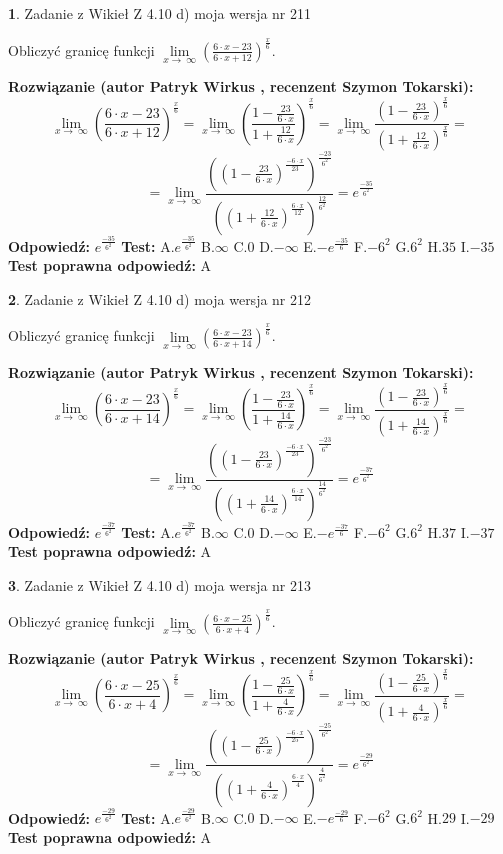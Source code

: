 \documentclass[12pt, a4paper]{article}
\theoremstyle{definition} %
\newtheorem{zad}{}
\newcommand{\zadStart}[1]{\begin{zad}#1\newline}
\newcommand{\zadStop}{\end{zad}}
\newcommand{\rozwStart}[2]{\noindent \textbf{Rozwiązanie (autor #1 , recenzent #2): }\newline}
\newcommand{\rozwStop}{\newline}
\newcommand{\odpStart}{\noindent \textbf{Odpowiedź:}\newline}
\newcommand{\odpStop}{\newline}
\newcommand{\testStart}{\noindent \textbf{Test:}\newline}
\newcommand{\testStop}{\newline}
\newcommand{\kluczStart}{\noindent \textbf{Test poprawna odpowiedź:}\newline}
\newcommand{\kluczStop}{\newline}
\begin{document}
\zadStart{Zadanie z Wikieł Z 4.10 d) moja wersja nr 211}


Obliczyć granicę funkcji  $\lim\limits_{x\to\ \infty}(\frac{6\cdot x-23}{6\cdot x+12})^{\frac{x}{6}}$.
\zadStop
\rozwStart{Patryk Wirkus}{Szymon Tokarski}
$$\lim\limits_{x\to\ \infty}(\frac{6\cdot x-23}{6\cdot x+12})^{\frac{x}{6}} = \lim\limits_{x\to\ \infty}(\frac{1-\frac{23}{6\cdot x}}{1+\frac{12}{6\cdot x}})^{\frac{x}{6}}=\lim\limits_{x\to\ \infty}\frac{(1-\frac{23}{6\cdot x})^{\frac{x}{6}}}{(1+\frac{12}{6\cdot x})^{\frac{x}{6}}}=$$
$$=\lim\limits_{x\to\ \infty}\frac{((1-\frac{23}{6\cdot x})^{\frac{-6\cdot x}{23}})^{\frac{-23}{6^{2}}}}{((1+\frac{12}{6\cdot x})^{\frac{6\cdot x}{12}})^{\frac{12}{6^{2}}}}=e^{\frac{-35}{6^{2}}}$$
\rozwStop
\odpStart
$e^{\frac{-35}{6^{2}}}$
\odpStop
\testStart
A.$e^{\frac{-35}{6^{2}}}$ B.$\infty$ C.$0$ D.$-\infty$ E.$-e^{\frac{-35}{6}}$
F.$-6^{2}$ G.$6^{2}$
H.$35$
I.$-35$
\testStop
\kluczStart
A
\kluczStop



\zadStart{Zadanie z Wikieł Z 4.10 d) moja wersja nr 212}


Obliczyć granicę funkcji  $\lim\limits_{x\to\ \infty}(\frac{6\cdot x-23}{6\cdot x+14})^{\frac{x}{6}}$.
\zadStop
\rozwStart{Patryk Wirkus}{Szymon Tokarski}
$$\lim\limits_{x\to\ \infty}(\frac{6\cdot x-23}{6\cdot x+14})^{\frac{x}{6}} = \lim\limits_{x\to\ \infty}(\frac{1-\frac{23}{6\cdot x}}{1+\frac{14}{6\cdot x}})^{\frac{x}{6}}=\lim\limits_{x\to\ \infty}\frac{(1-\frac{23}{6\cdot x})^{\frac{x}{6}}}{(1+\frac{14}{6\cdot x})^{\frac{x}{6}}}=$$
$$=\lim\limits_{x\to\ \infty}\frac{((1-\frac{23}{6\cdot x})^{\frac{-6\cdot x}{23}})^{\frac{-23}{6^{2}}}}{((1+\frac{14}{6\cdot x})^{\frac{6\cdot x}{14}})^{\frac{14}{6^{2}}}}=e^{\frac{-37}{6^{2}}}$$
\rozwStop
\odpStart
$e^{\frac{-37}{6^{2}}}$
\odpStop
\testStart
A.$e^{\frac{-37}{6^{2}}}$ B.$\infty$ C.$0$ D.$-\infty$ E.$-e^{\frac{-37}{6}}$
F.$-6^{2}$ G.$6^{2}$
H.$37$
I.$-37$
\testStop
\kluczStart
A
\kluczStop



\zadStart{Zadanie z Wikieł Z 4.10 d) moja wersja nr 213}


Obliczyć granicę funkcji  $\lim\limits_{x\to\ \infty}(\frac{6\cdot x-25}{6\cdot x+4})^{\frac{x}{6}}$.
\zadStop
\rozwStart{Patryk Wirkus}{Szymon Tokarski}
$$\lim\limits_{x\to\ \infty}(\frac{6\cdot x-25}{6\cdot x+4})^{\frac{x}{6}} = \lim\limits_{x\to\ \infty}(\frac{1-\frac{25}{6\cdot x}}{1+\frac{4}{6\cdot x}})^{\frac{x}{6}}=\lim\limits_{x\to\ \infty}\frac{(1-\frac{25}{6\cdot x})^{\frac{x}{6}}}{(1+\frac{4}{6\cdot x})^{\frac{x}{6}}}=$$
$$=\lim\limits_{x\to\ \infty}\frac{((1-\frac{25}{6\cdot x})^{\frac{-6\cdot x}{25}})^{\frac{-25}{6^{2}}}}{((1+\frac{4}{6\cdot x})^{\frac{6\cdot x}{4}})^{\frac{4}{6^{2}}}}=e^{\frac{-29}{6^{2}}}$$
\rozwStop
\odpStart
$e^{\frac{-29}{6^{2}}}$
\odpStop
\testStart
A.$e^{\frac{-29}{6^{2}}}$ B.$\infty$ C.$0$ D.$-\infty$ E.$-e^{\frac{-29}{6}}$
F.$-6^{2}$ G.$6^{2}$
H.$29$
I.$-29$
\testStop
\kluczStart
A
\kluczStop
\end{document}
